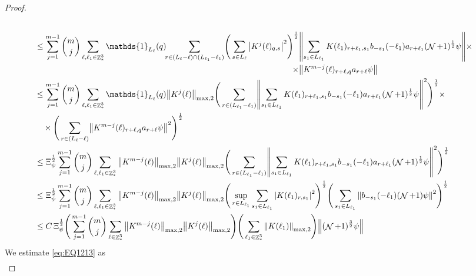 \documentclass[sn-mathphys, Numbered ,a4paper]{sn-jnl}%
\DeclareMathOperator{\Z}{\mathbb{Z}}
\DeclareMathOperator{\NN}{\mathcal{N}}
\newcommand{\half}{\frac{1}{2}}
\theoremstyle{plain}
\theoremstyle{definition}
\theoremstyle{remark}
\theoremstyle{plain}
\theoremstyle{definition}
\theoremstyle{remark}
\begin{document}
\begin{proof}
\begin{alignat}{2}
\begin{aligned}[t]
	\end{aligned} \nonumber\\
	&\leq \sum\limits_{j=1}^{m-1} {{m}\choose j} \sum\limits_{\ell, \ell_1\in \Z^3_*} \mathds{1}_{L_{\ell}}(q)\!\! \sum\limits_{r\in (L_{\ell}-\ell) \cap (L_{\ell_1}-\ell_1)}\! \Bigg( \sum\limits_{s \in L_\ell}\begin{aligned}[t]
		\abs{K^{j}(\ell)_{q,s}}^2\Bigg)^\half &\norm{ \sum\limits_{ s_1 \in L_{\ell_1}}  K(\ell_1)_{r+\ell_1,s_1} b_{-s_1}(-\ell_1)  a_{r+\ell_1}(\NN+1)^\half\psi}\times\nonumber\\ \times&\norm{  K^{m-j}(\ell)_{r+\ell,q} a_{r+\ell} \psi }
	\end{aligned} \nonumber\\
	&\leq \sum\limits_{j=1}^{m-1} {{m}\choose j} \sum\limits_{\ell, \ell_1\in \Z^3_*} \mathds{1}_{L_{\ell}}(q) \norm{K^{j}(\ell)}_{\mathrm{max,2}} \Bigg( \sum\limits_{r\in  (L_{\ell_1}-\ell_1)}\! \norm{ \sum\limits_{ s_1 \in L_{\ell_1}}  K(\ell_1)_{r+\ell_1,s_1} b_{-s_1}(-\ell_1)  a_{r+\ell_1} (\NN+1)^\half\psi} ^2\Bigg)^\half \times\nonumber\\ &\quad\times\Bigg( \sum\limits_{r\in (L_{\ell}-\ell) }\!\norm{  K^{m-j}(\ell)_{r+\ell,q} a_{r+\ell} \psi }^2\Bigg)^\half\nonumber\\
	&\leq \Xi_{\psi}^\half \sum\limits_{j=1}^{m-1} {{m}\choose j} \sum\limits_{\ell, \ell_1\in \Z^3_*} \norm{K^{m-j}(\ell)}_{\mathrm{max,2}} \norm{K^{j}(\ell)}_{\mathrm{max,2}} \Bigg( \sum\limits_{r\in (L_{\ell_1}-\ell_1)}\! \norm{ \sum\limits_{ s_1 \in L_{\ell_1}}  K(\ell_1)_{r+\ell_1,s_1} b_{-s_1}(-\ell_1)  a_{r+\ell_1} (\NN+1)^\half\psi} ^2\Bigg)^\half \nonumber\\
	&\leq \Xi_{\psi}^\half \sum\limits_{j=1}^{m-1} {{m}\choose j} \sum\limits_{\ell, \ell_1\in \Z^3_*} \norm{K^{m-j}(\ell)}_{\mathrm{max,2}} \norm{K^{j}(\ell)}_{\mathrm{max,2}} \Bigg(\sup_{r \in L_{\ell_1}} \sum\limits_{ s_1 \in L_{\ell_1}}\abs{  K(\ell_1)_{r,s_1} }^2\Bigg)^\half \Bigg(  \sum\limits_{ s_1 \in L_{\ell_1}}\norm{   b_{-s_1}(-\ell_1)  (\NN+1)\psi} ^2\Bigg)^\half \nonumber\\
	&\leq C\, \Xi_{\psi}^\half \Bigg(\sum\limits_{j=1}^{m-1} {{m}\choose j} \sum\limits_{\ell \in \Z^3_*} \norm{K^{m-j}(\ell)}_{ \mathrm{max,2} } \norm{K^{j}(\ell)}_{\mathrm{max,2}}\Bigg) \Bigg(\sum\limits_{ \ell_1\in \Z^3_*}\norm{  K(\ell_1)}_{\mathrm{max,2}}\Bigg)  \norm{(\NN+1)^\frac{3}{2} \psi} \label{eq:estEQ1212}
\end{alignat} 
We estimate \eqref{eq:EQ1213} as
\begin{align}

\end{align}
\end{proof}
\end{document}
